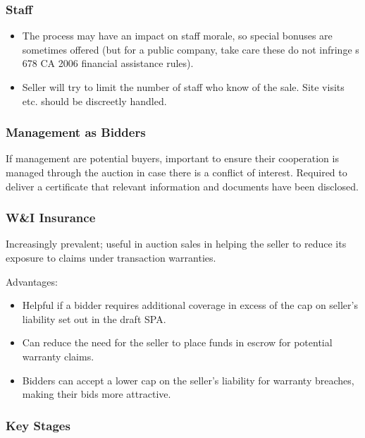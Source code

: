 \documentclass[
]{article}
\providecommand{\tightlist}{%
  \setlength{\itemsep}{0pt}\setlength{\parskip}{0pt}}
\begin{document}
\hypertarget{staff}{%
\subsubsection{Staff}\label{staff}}

\begin{itemize}
\tightlist
\item
  The process may have an impact on staff morale, so special bonuses are
  sometimes offered (but for a public company, take care these do not
  infringe s 678 CA 2006 financial assistance rules).
\item
  Seller will try to limit the number of staff who know of the sale.
  Site visits etc. should be discreetly handled.
\end{itemize}

\hypertarget{management-as-bidders}{%
\subsubsection{Management as Bidders}\label{management-as-bidders}}

If management are potential buyers, important to ensure their
cooperation is managed through the auction in case there is a conflict
of interest. Required to deliver a certificate that relevant information
and documents have been disclosed.

\hypertarget{wi-insurance}{%
\subsubsection{W\&I Insurance}\label{wi-insurance}}

Increasingly prevalent; useful in auction sales in helping the seller to
reduce its exposure to claims under transaction warranties.

Advantages:

\begin{itemize}
\tightlist
\item
  Helpful if a bidder requires additional coverage in excess of the cap
  on seller's liability set out in the draft SPA.
\item
  Can reduce the need for the seller to place funds in escrow for
  potential warranty claims.
\item
  Bidders can accept a lower cap on the seller's liability for warranty
  breaches, making their bids more attractive.
\end{itemize}

\hypertarget{key-stages}{%
\subsubsection{Key Stages}\label{key-stages}}
\end{document}
